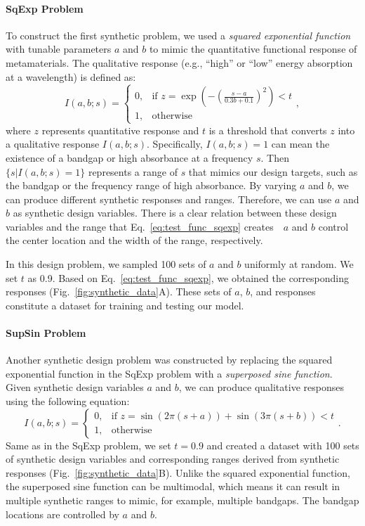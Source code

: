 \documentclass{article}
\begin{document}
\paragraph{SqExp Problem} To construct the first synthetic problem, we used a \textit{squared exponential function} with tunable parameters $a$ and $b$ to mimic the quantitative functional response of metamaterials. The qualitative response (e.g., ``high'' or ``low'' energy absorption at a wavelength) is defined as: 
\begin{equation}
I(a,b; s) =
    \begin{cases}
      0, & \text{if $z = \exp\left(-{\left(\frac{s-a}{0.3b+0.1}\right)^2}\right) < t$} \\
      1, & \text{otherwise}
    \end{cases},
\label{eq:test_func_sqexp}
\end{equation}
where $z$ represents quantitative response and $t$ is a threshold that converts $z$ into a qualitative response $I(a,b; s)$. Specifically, $I(a,b; s) = 1$ can mean the existence of a bandgap or high absorbance at a frequency $s$. Then $\{s|I(a,b; s) = 1\}$ represents a range of $s$ that mimics our design targets, such as the bandgap or the frequency range of high absorbance. By varying $a$ and $b$, we can produce different synthetic responses and ranges. Therefore, we can use $a$ and $b$ as synthetic design variables. There is a clear relation between these design variables and the range that Eq.~\ref{eq:test_func_sqexp} creates~\textemdash~$a$ and $b$ control the center location and the width of the range, respectively.

In this design problem, we sampled 100 sets of $a$ and $b$ uniformly at random. We set $t$ as 0.9. Based on Eq.~\ref{eq:test_func_sqexp}, we obtained the corresponding responses (Fig.~\ref{fig:synthetic_data}A). These sets of $a$, $b$, and responses constitute a dataset for training and testing our model. 

\paragraph{SupSin Problem} Another synthetic design problem was constructed by replacing
the squared exponential function in the SqExp problem with a \textit{superposed sine function}. Given synthetic design variables $a$ and $b$, we can produce qualitative responses using the following equation:
\begin{equation}
I(a,b; s) =
    \begin{cases}
      0, & \text{if $z = \sin\left(2\pi(s+a)\right) + \sin\left(3\pi(s+b)\right) < t$} \\
      1, & \text{otherwise}
    \end{cases}.
\label{eq:test_func_sin}
\end{equation}
Same as in the SqExp problem, we set $t=0.9$ and created a dataset with 100 sets of synthetic design variables and corresponding ranges derived from synthetic responses (Fig.~\ref{fig:synthetic_data}B). 
Unlike the squared exponential function, the superposed sine function can be multimodal, which means it can result in multiple synthetic ranges to mimic, for example, multiple bandgaps. The bandgap locations are controlled by $a$ and $b$.
\end{document}
